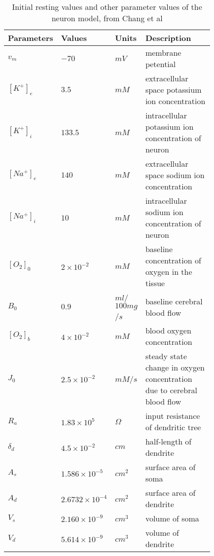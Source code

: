 \documentclass[fleqn]{report}
\numberwithin{equation}{section}
\numberwithin{equation}{section}
\begin{document}
				            	\begin{table*}[h!]
				            				\centering
				            				\caption{Initial resting values and other parameter values of the neuron model, from Chang et al\citep{Chang2013}}
				            				\begin{tabular}{| p{0.15\linewidth} | >{\footnotesize} p{0.14\linewidth} | >{\footnotesize} p{0.14\linewidth} | >{\footnotesize} p{0.4\linewidth} |}
				            				\hline
				            				
				            				\bf Parameters		& \bf Values  & \bf Units  &\bf Description      \\
				            				
				            				\hline
				            				$v_m$&$-70$&$mV$&membrane petential\\
				            				$[K^+]_e$&$3.5$&$mM$&extracellular space potassium ion concentration\\
				            				$[K^+]_i$&$133.5$&$mM$&intracellular potassium ion concentration of neuron\\
				            				$[Na^+]_e$&$140$&$mM$&extracellular space sodium ion concentration\\
				            				$[Na^+]_i$&$10$&$mM$&intracellular sodium ion concentration of neuron\\
				            				$[O_2]_0$&$2\times10^{-2}$&$mM$&baseline concentration of oxygen in the tissue\\
				            				$B_{0}$&$0.9$&$ml$/$100mg$/$s$&baseline cerebral blood flow\\
				            				$[O_2]_b$&$4\times10^{-2}$&$mM$&blood oxygen concentration\\
				            				$J_0$&$2.5\times10^{-2}$&$mM$/$s$&steady state change in oxygen concentration due to cerebral blood flow \\
				            				$R_a$&$1.83\times10^5$&$\Omega$&input resistance of dendritic tree\\
				            				$\delta_d$&$4.5\times10^{-2}$&$cm$&half-length of dendrite\\
				            				$A_s$&$1.586\times10^{-5}$&$cm^2$&surface area of soma\\
				            				$A_d$&$2.6732\times10^{-4}$&$cm^2$&surface area of dendrite\\
				            				$V_s$&$2.160\times10^{-9}$&$cm^3$&volume of soma\\
				            				$V_d$&$5.614\times10^{-9}$&$cm^3$&volume of dendrite\\

\end{tabular}
\end{table*}
\end{document}
